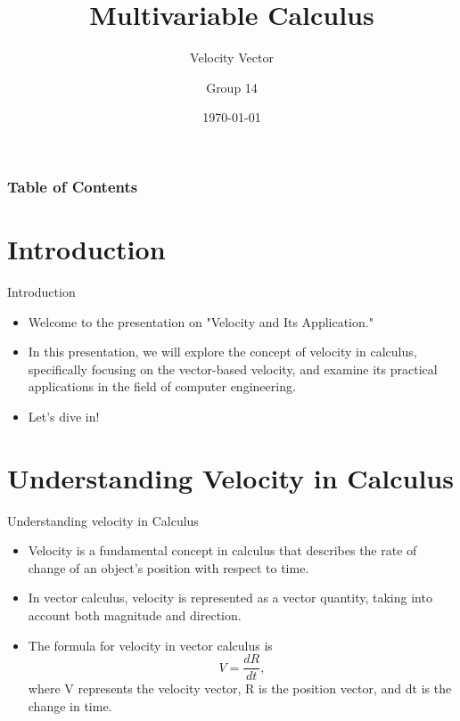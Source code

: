 \documentclass{beamer}
\title{Multivariable Calculus}
\subtitle{Velocity Vector}
\author{Group 14}
\institute{Computer Engineering}
\date{\today}
\begin{document}
\begin{frame}[plain]
    \titlepage
\end{frame}


{
\begin{frame}
    \frametitle{Table of Contents}
    \tableofcontents
\end{frame}
}


\section{Introduction}

\begin{frame}{Introduction}
    \begin{itemize}
        \item Welcome to the presentation on "Velocity and Its Application."
        \item In this presentation, we will explore the concept of velocity in calculus, specifically focusing
on the vector-based velocity, and examine its practical applications in the field of computer
engineering.
        \item Let's dive in!
    \end{itemize}
\end{frame}




\section{Understanding Velocity in Calculus}


\begin{frame}[t]{Understanding velocity in Calculus}
    \vspace{20pt}
    \begin{itemize}
        \item Velocity is a fundamental concept in calculus that describes the rate of change of an
object's position with respect to time.  
        \item In vector calculus, velocity is represented as a vector quantity, taking into account both
magnitude and direction.
        \item The formula for velocity in vector calculus is 
          \begin{equation*}
        V = \frac{dR}{dt},
        \end{equation*}
        where V represents the velocity
vector, R is the position vector, and dt is the change in time.
    \end{itemize}
\end{frame}
\end{document}
